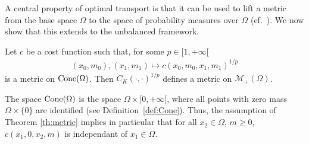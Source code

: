 A central property of optimal transport is that it can be used to lift a metric from the base space $\Omega$ to the space of probability measures over $\Omega$ (cf.\ \cite[Chapter 6]{villani2009oldnew}). We now show that this extends to the unbalanced framework.
\begin{theorem}[Metric]
\label{th:metric}
Let $c$ be a cost function such that, for some $p \in [1, + \infty[$ 
\begin{align}
	\label{eq:CMetric}
	(x_0,m_0), (x_1,m_1) \mapsto c(x_0,m_0,x_1,m_1)^{1/p}
\end{align}
is a metric on  $\operatorname{Cone}(\Omega)$. Then $C_K(\cdot,\cdot)^{1/p}$ defines a metric on $\mathcal{M}_+(\Omega)$.
\end{theorem}
\begin{remark}
The space $\operatorname{Cone}(\Omega)$ is the space $\Omega \times [0,+\infty[$, where all points with zero mass $\Omega \times \{0\}$ are identified (see Definition~\ref{def:Cone}). Thus, the assumption of Theorem \ref{th:metric} implies in particular that for all $x_2\in \Omega$, $m\geq0$, 
$c(x_1, 0, x_2, m)$ is independant of $x_1\in \Omega$.

\end{remark}

